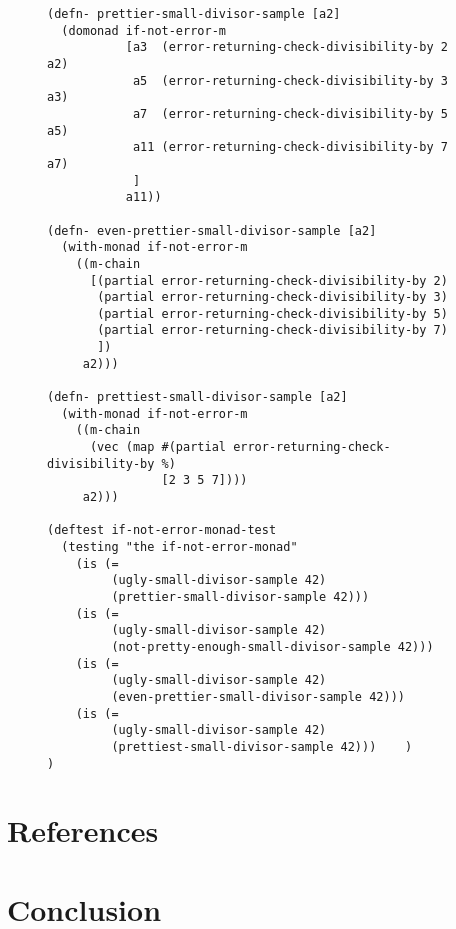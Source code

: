\documentclass[11pt]{article}
\begin{document}
\begin{figure}[H]
\begin{verbatim}
(defn- prettier-small-divisor-sample [a2]
  (domonad if-not-error-m
           [a3  (error-returning-check-divisibility-by 2 a2)
            a5  (error-returning-check-divisibility-by 3 a3)
            a7  (error-returning-check-divisibility-by 5 a5)
            a11 (error-returning-check-divisibility-by 7 a7)
            ]
           a11))

(defn- even-prettier-small-divisor-sample [a2]
  (with-monad if-not-error-m
    ((m-chain
      [(partial error-returning-check-divisibility-by 2)
       (partial error-returning-check-divisibility-by 3)
       (partial error-returning-check-divisibility-by 5)
       (partial error-returning-check-divisibility-by 7)
       ])
     a2)))

(defn- prettiest-small-divisor-sample [a2]
  (with-monad if-not-error-m
    ((m-chain
      (vec (map #(partial error-returning-check-divisibility-by %)
                [2 3 5 7])))
     a2)))

(deftest if-not-error-monad-test
  (testing "the if-not-error-monad"
    (is (=
         (ugly-small-divisor-sample 42)
         (prettier-small-divisor-sample 42)))
    (is (=
         (ugly-small-divisor-sample 42)
         (not-pretty-enough-small-divisor-sample 42)))
    (is (=
         (ugly-small-divisor-sample 42)
         (even-prettier-small-divisor-sample 42)))
    (is (=
         (ugly-small-divisor-sample 42)
         (prettiest-small-divisor-sample 42)))    )
)
\end{verbatim}
\end{figure}
\section{References}
\label{sec-4}

\section{Conclusion}
\label{sec-5}
\end{document}
